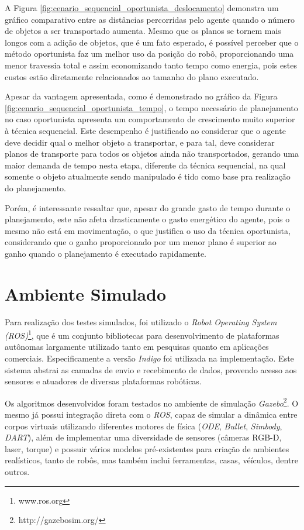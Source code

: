 A Figura \ref{fig:cenario_sequencial_oportunista_deslocamento} demonstra um gráfico comparativo entre as distâncias percorridas pelo agente quando o número de objetos a ser transportado aumenta. Mesmo que os planos se tornem mais longos com a adição de objetos, que é um fato esperado, é possível perceber que o método oportunista faz um melhor uso da posição do robô, proporcionando uma menor travessia total e assim economizando tanto tempo como energia, pois estes custos estão diretamente relacionados ao tamanho do plano executado.

Apesar da vantagem apresentada, como é demonstrado no gráfico da Figura \ref{fig:cenario_sequencial_oportunista_tempo}, o tempo necessário de planejamento no caso oportunista apresenta um comportamento de crescimento muito superior à técnica sequencial.
Este desempenho é justificado ao considerar que o agente deve decidir qual o melhor objeto a transportar, e para tal, deve considerar planos de transporte para todos os objetos ainda não transportados, gerando uma maior demanda de tempo nesta etapa, diferente da técnica sequencial, na qual somente o objeto atualmente sendo manipulado é tido como base pra realização do planejamento.

Porém, é interessante ressaltar que, apesar do grande gasto de tempo durante o planejamento, este não afeta drasticamente o gasto energético do agente, pois o mesmo não está em movimentação, o que justifica o uso da técnica oportunista, considerando que o ganho proporcionado por um menor plano é superior ao ganho quando o planejamento é executado rapidamente.

\section{Ambiente Simulado} %
\label{sub:ambiente_simulado}

Para realização dos testes simulados, foi utilizado o \emph{Robot Operating System (ROS)}\footnote{www.ros.org}, que é um conjunto bibliotecas para desenvolvimento de plataformas autônomas largamente utilizado tanto em pesquisas quanto em aplicações comerciais. Especificamente a versão \emph{Indigo} foi utilizada na implementação.
Este sistema abstrai as camadas de envio e recebimento de dados, provendo acesso aos sensores e atuadores de diversas plataformas robóticas.

Os algoritmos desenvolvidos foram testados no ambiente de simulação \emph{Gazebo}\footnote{http://gazebosim.org/}. O mesmo já possui integração direta com o \emph{ROS}, capaz de simular a dinâmica entre corpos virtuais utilizando diferentes motores de física (\emph{ODE}, \emph{Bullet}, \emph{Simbody}, \emph{DART}), além de implementar uma diversidade de sensores (câmeras RGB-D, laser, torque) e possuir vários modelos pré-existentes para criação de ambientes realísticos, tanto de robôs, mas também inclui ferramentas, casas, véículos, dentre outros.

